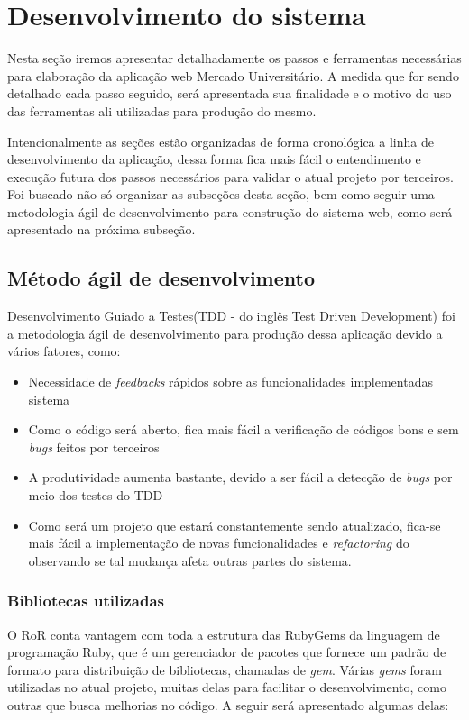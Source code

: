 \chapter{Desenvolvimento do sistema}
\label{chap:etapas_desenvolvimento}

Nesta seção iremos apresentar detalhadamente os passos e ferramentas necessárias para elaboração da aplicação web Mercado Universitário. A medida que for sendo detalhado cada passo seguido, será apresentada sua finalidade e o motivo do uso das ferramentas ali utilizadas para produção do mesmo. \par
Intencionalmente as seções estão organizadas de forma cronológica a linha de desenvolvimento da aplicação, dessa forma fica mais fácil o entendimento e execução futura dos passos necessários para validar o atual projeto por terceiros. Foi buscado não só organizar as subseções desta seção, bem como seguir uma metodologia ágil de desenvolvimento para construção do sistema web, como será apresentado na próxima subseção.

\section{Método ágil de desenvolvimento}

Desenvolvimento Guiado a Testes(TDD - do inglês Test Driven Development) foi a metodologia ágil de desenvolvimento para produção dessa aplicação devido a vários fatores, como:
\begin{itemize}  
\item Necessidade de \textit{feedbacks} rápidos sobre as funcionalidades implementadas sistema
\item Como o código será aberto, fica mais fácil a verificação de códigos bons e sem \textit{bugs} feitos por terceiros
\item A produtividade aumenta bastante, devido a ser fácil a detecção de \textit{bugs} por meio dos testes do TDD
\item Como será um projeto que estará constantemente sendo atualizado, fica-se mais fácil a implementação de novas funcionalidades e \textit{refactoring} do observando se tal mudança afeta outras partes do sistema.
\end{itemize}

\subsection{Bibliotecas utilizadas}
O RoR conta vantagem com toda a estrutura das RubyGems da linguagem de programação Ruby, que é um gerenciador de pacotes que fornece um padrão de formato para distribuição de bibliotecas, chamadas de \textit{gem}. Várias \textit{gems} foram utilizadas no atual projeto, muitas delas para facilitar o desenvolvimento, como outras que busca melhorias no código. A seguir será apresentado algumas delas:

